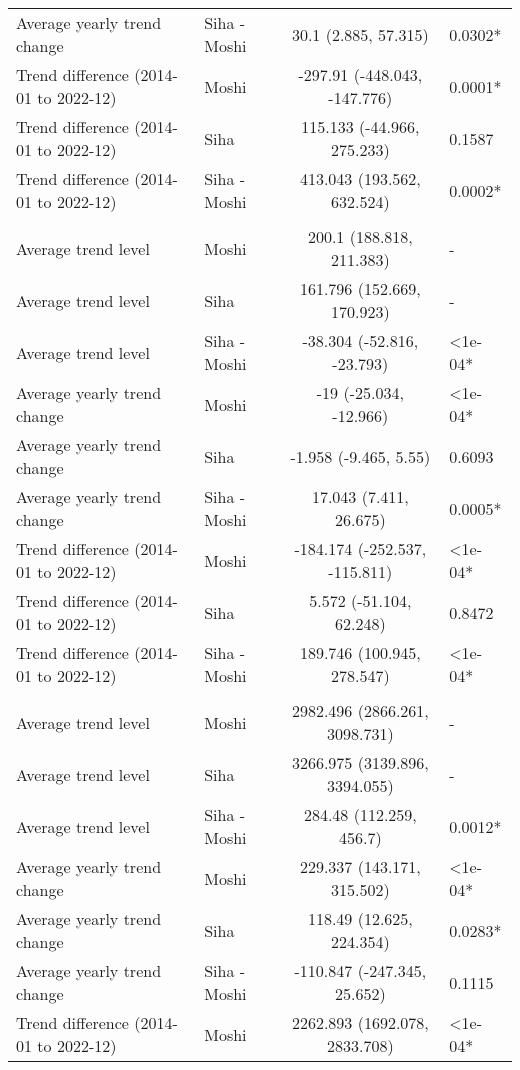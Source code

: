 \begin{longtable}{l|lcl}
Average yearly trend change & Siha - Moshi & 30.1 (2.885, 57.315) & 0.0302* \\ 
Trend difference (2014-01 to 2022-12) & Moshi & -297.91 (-448.043, -147.776) & 0.0001* \\ 
Trend difference (2014-01 to 2022-12) & Siha & 115.133 (-44.966, 275.233) & 0.1587 \\ 
Trend difference (2014-01 to 2022-12) & Siha - Moshi & 413.043 (193.562, 632.524) & 0.0002* \\ 
\midrule\addlinespace[2.5pt]
\multicolumn{4}{l}{Respiratory Diseases} \\[2.5pt] 
\midrule\addlinespace[2.5pt]
Average trend level & Moshi & 200.1 (188.818, 211.383) & - \\ 
Average trend level & Siha & 161.796 (152.669, 170.923) & - \\ 
Average trend level & Siha - Moshi & -38.304 (-52.816, -23.793) & <1e-04* \\ 
Average yearly trend change & Moshi & -19 (-25.034, -12.966) & <1e-04* \\ 
Average yearly trend change & Siha & -1.958 (-9.465, 5.55) & 0.6093 \\ 
Average yearly trend change & Siha - Moshi & 17.043 (7.411, 26.675) & 0.0005* \\ 
Trend difference (2014-01 to 2022-12) & Moshi & -184.174 (-252.537, -115.811) & <1e-04* \\ 
Trend difference (2014-01 to 2022-12) & Siha & 5.572 (-51.104, 62.248) & 0.8472 \\ 
Trend difference (2014-01 to 2022-12) & Siha - Moshi & 189.746 (100.945, 278.547) & <1e-04* \\ 
\midrule\addlinespace[2.5pt]
\multicolumn{4}{l}{Respiratory Infections} \\[2.5pt] 
\midrule\addlinespace[2.5pt]
Average trend level & Moshi & 2982.496 (2866.261, 3098.731) & - \\ 
Average trend level & Siha & 3266.975 (3139.896, 3394.055) & - \\ 
Average trend level & Siha - Moshi & 284.48 (112.259, 456.7) & 0.0012* \\ 
Average yearly trend change & Moshi & 229.337 (143.171, 315.502) & <1e-04* \\ 
Average yearly trend change & Siha & 118.49 (12.625, 224.354) & 0.0283* \\ 
Average yearly trend change & Siha - Moshi & -110.847 (-247.345, 25.652) & 0.1115 \\ 
Trend difference (2014-01 to 2022-12) & Moshi & 2262.893 (1692.078, 2833.708) & <1e-04* \\ 

\end{longtable}
